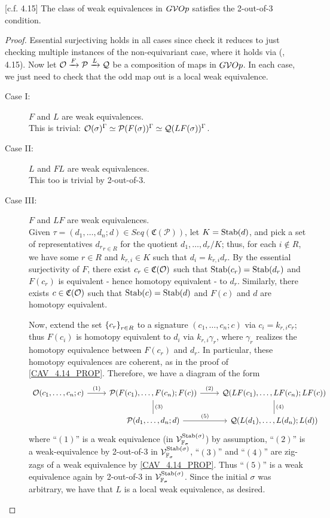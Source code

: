\documentclass[psamsfonts,onesided,10pt,letterpaper]{amsart}%
\renewcommand{\C}{\ensuremath{\mathfrak{C}}}
\renewcommand{\P}{\ensuremath{\mathcal{P}}}
\newcommand{\Q}{\ensuremath{\mathcal{Q}}}
\newcommand{\Vsigma}{\ensuremath{\V^{\Stab(\sigma)}_{\F_\sigma}}}
\begin{document}
\begin{proposition}
  \label{CAV_4.15_PROP}
  [c.f. \cite{Cav14} 4.15]
  The class of weak equivalences in $G\mathcal V Op$ satisfies the 2-out-of-3 condition.
\end{proposition}
\begin{proof}
  Essential surjectiving holds in all cases since check it reduces to just checking multiple instances of the non-equivariant case, where it holds via (\cite{Cav14}, 4.15). Now let $\O \xrightarrow{F} \P \xrightarrow{L} \Q$ be a composition of maps in $G\mathcal V Op$. In each case, we just need to check that the odd map out is a local weak equivalence.
  \begin{description}
  \item[Case I:] $F$ and $L$ are weak equivalences.\\
    This is trivial: $\O(\sigma)^\Gamma \simeq \P(F(\sigma))^\Gamma \simeq \Q(LF(\sigma))^\Gamma$.
  \item[Case II:] $L$ and $FL$ are weak equivalences.\\
    This too is trivial by 2-out-of-3. 
  \item[Case III:] $F$ and $LF$ are weak equivalences.\\
    Given $\tau = (d_1,\ldots,d_n;d)\in Seq(\C(\P))$, let $K = \mathrm{Stab}(d)$, and pick a set of representatives ${d_r}_{r\in R}$ for the quotient ${d_1,\ldots, d_r}/K$; thus, for each $i\not\in R$, we have some $r\in R$ and $k_{r,i}\in K$ such that $d_i = k_{r,i}d_r$. By the essential surjectivity of $F$, there exist $c_r\in \C(\O)$ such that $\mathrm{Stab}(c_r) = \mathrm{Stab}(d_r)$ and $F(c_r)$ is equivalent - hence homotopy equivalent - to $d_r$. Similarly, there exists $c\in \C(\O)$ such that $\mathrm{Stab}(c) = \mathrm{Stab}(d)$ and $F(c)$ and $d$ are homotopy equivalent. 

Now, extend the set $\left\{c_r\right\}_{r\in R}$ to a signature $(c_1,\ldots, c_n;c)$ via $c_i = k_{r,i}c_r$; thus $F(c_i)$ is homotopy equivalent to $d_i$ via $k_{r,i}\gamma_r$, where $\gamma_r$ realizes the homotopy equivalence between $F(c_r)$ and $d_r$. In particular, these homotopy equivalences are coherent, as in the proof of \ref{CAV_4.14_PROP}. Therefore, we have a diagram of the form
\[
\begin{tikzcd}
  \O(c_1,\ldots, c_n;c) \arrow[r, "(1)"] & \P(F(c_1),\ldots, F(c_n); F(c)) \arrow[d,dash, "(3)"] \arrow[r, "(2)"] & \Q(LF(c_1),\ldots, LF(c_n);LF(c)) \arrow[d, dash, "(4)"] \\
  & \P(d_1,\ldots, d_n;d) \arrow[r, "(5)"] & \Q(L(d_1),\ldots, L(d_n); L(d))
\end{tikzcd}
\]
where ``$(1)$'' is a weak equivalence (in $\Vsigma$) by assumption, ``$(2)$'' is a weak-equivalence by 2-out-of-3 in $\Vsigma$, ``$(3)$'' and ``$(4)$'' are zig-zags of a weak equivalence by \ref{CAV_4.14_PROP}. Thus ``$(5)$'' is a weak equivalence again by 2-out-of-3 in $\Vsigma$. Since the initial $\sigma$ was arbitrary, we have that $L$ is a local weak equivalence, as desired.
  \end{description}
\end{proof}
\end{document}
